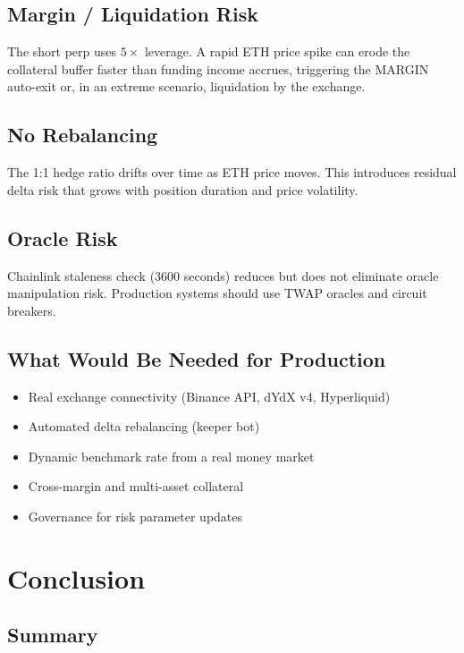 \documentclass[11pt,a4paper]{article}
\begin{document}
\subsection{Margin / Liquidation Risk}
The short perp uses $5\times$ leverage. A rapid ETH price spike can erode the collateral buffer faster than funding income accrues, triggering the MARGIN auto-exit or, in an extreme scenario, liquidation by the exchange.

\subsection{No Rebalancing}
The 1:1 hedge ratio drifts over time as ETH price moves. This introduces residual delta risk that grows with position duration and price volatility.

\subsection{Oracle Risk}
Chainlink staleness check (3600 seconds) reduces but does not eliminate oracle manipulation risk. Production systems should use TWAP oracles and circuit breakers.

\subsection{What Would Be Needed for Production}

\begin{itemize}
    \item Real exchange connectivity (Binance API, dYdX v4, Hyperliquid)
    \item Automated delta rebalancing (keeper bot)
    \item Dynamic benchmark rate from a real money market
    \item Cross-margin and multi-asset collateral
    \item Governance for risk parameter updates
\end{itemize}

\section{Conclusion}

\subsection{Summary}
\end{document}
